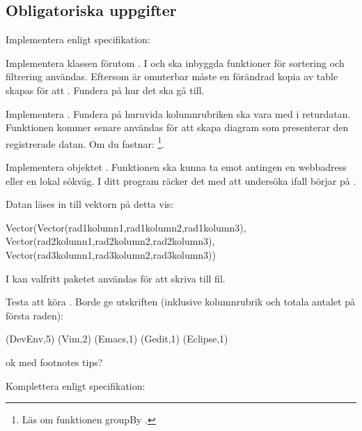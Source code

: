 


\subsection{Obligatoriska uppgifter}

\Task Implementera  enligt specifikation:


\Subtask Implementera klassen  förutom . I  och  ska inbyggda funktioner för sortering och filtrering användas. Eftersom  är omuterbar måste en förändrad kopia av table skapas för att . Fundera på hur det ska gå till.

\Subtask Implementera . Fundera på huruvida kolumnrubriken ska vara med i returdatan. Funktionen kommer senare användas för att skapa diagram som presenterar den registrerade datan. Om du fastnar: \footnote{Läs om funktionen groupBy .}.

\Subtask Implementera objektet . Funktionen  ska kunna ta emot antingen en webbadress eller en lokal sökväg. I ditt program räcker det med att undersöka ifall  börjar på .

Datan läses in till vektorn på detta vis:
\begin{CodeSmall}[language=, ]
Vector(Vector(rad1kolumn1,rad1kolumn2,rad1kolumn3),
       Vector(rad2kolumn1,rad2kolumn2,rad2kolumn3),
       Vector(rad3kolumn1,rad3kolumn2,rad3kolumn3))
\end{CodeSmall}
I  kan valfritt paketet användas för att skriva till fil.

\Subtask Testa att köra . Borde ge utskriften (inklusive kolumnrubrik och totala antalet på första raden):
\begin{REPLnonum}
(DevEnv,5)
(Vim,2)
(Emacs,1)
(Gedit,1)
(Eclipse,1)
\end{REPLnonum}

\TODO ok med footnotes tips?



\Task Komplettera  enligt specifikation:


